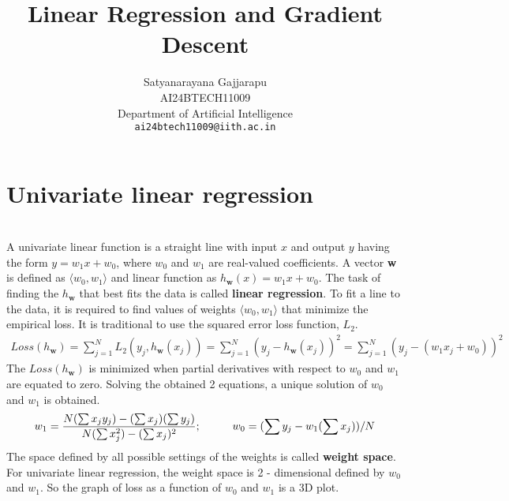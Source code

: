 \documentclass{article}
\title{Linear Regression and Gradient Descent}
\author{%
Satyanarayana Gajjarapu \\
AI24BTECH11009 \\
Department of Artificial Intelligence \\
\texttt{ai24btech11009@iith.ac.in} \\
}
\begin{document}
\maketitle
\section{Univariate linear regression}
\begin{paragraph}
\\
A univariate linear function is a straight line with input $x$ and output $y$ having the form $y = w_1x + w_0$, where $w_0$ and $w_1$ are real-valued coefficients. A vector \textbf{w} is defined as $\langle w_0,w_1 \rangle$ and linear function as $h_\textbf{w}(x) = w_1x + w_0$. The task of finding the $h_\textbf{w}$ that best fits the data is called \textbf{linear regression}. To fit a line to the data, it is required to find values of weights $\langle w_0,w_1 \rangle$ that minimize the empirical loss. It is traditional to use the squared error loss function, $L_2$.
\begin{align*}
    Loss(h_\textbf{w}) = \sum_{j = 1}^{N} L_2(y_j,h_\textbf{w}(x_j)) = \sum_{j = 1}^{N} (y_j - h_\textbf{w}(x_j))^2 = \sum_{j = 1}^{N} (y_j - (w_1x_j + w_0))^2
\end{align*}
The $Loss(h_\textbf{w})$ is minimized when partial derivatives with respect to $w_0$ and $w_1$ are equated to zero. Solving the obtained 2 equations, a unique solution of $w_0$ and $w_1$ is obtained.
\begin{align*}
w_1 = \frac{N(\sum x_jy_j) - (\sum x_j)(\sum y_j)}{N(\sum x^2_j) - (\sum x_j)^2};\hspace{1 cm}w_0 = (\sum y_j - w_1(\sum x_j))/N
\end{align*}
The space defined by all possible settings of the weights is called \textbf{weight space}. For univariate linear regression, the weight space is 2 - dimensional defined by $w_0$ and $w_1$. So the graph of loss as a function of $w_0$ and $w_1$ is a 3D plot.
\end{paragraph}
\end{document}
